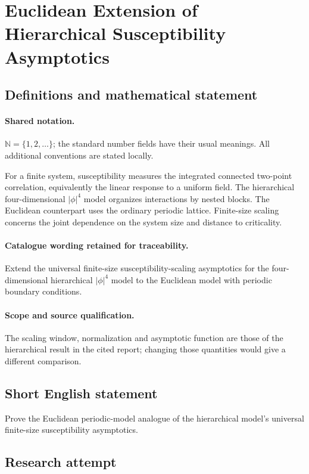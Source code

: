 \documentclass[11pt]{article}
\begin{document}
\section{Euclidean Extension of Hierarchical Susceptibility Asymptotics}\label{statement}

\subsection{Definitions and mathematical statement}

\paragraph{Shared notation.}$\mathbb N=\{1,2,\ldots\}$; the standard number fields have their usual meanings. All additional conventions are stated locally.


For a finite system, susceptibility measures the integrated connected two-point correlation, equivalently the linear response to a uniform field. The hierarchical four-dimensional $|\phi|^4$ model organizes interactions by nested blocks. The Euclidean counterpart uses the ordinary periodic lattice. Finite-size scaling concerns the joint dependence on the system size and distance to criticality.

\paragraph{Catalogue wording retained for traceability.}
Extend the universal finite-size susceptibility-scaling asymptotics for the four-dimensional hierarchical $|\phi|^4$ model to the Euclidean model with periodic boundary conditions.

\paragraph{Scope and source qualification.}The scaling window, normalization and asymptotic function are those of the hierarchical result in the cited report; changing those quantities would give a different comparison.
\subsection{Short English statement}
Prove the Euclidean periodic-model analogue of the hierarchical model's universal finite-size susceptibility asymptotics.
\subsection{Research attempt}
\end{document}
